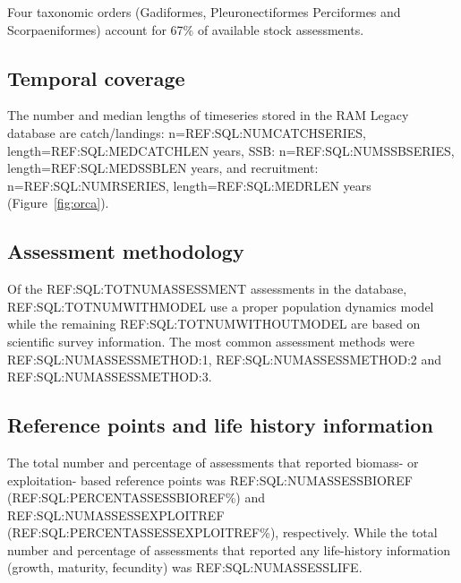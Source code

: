 Four taxonomic orders (Gadiformes, Pleuronectiformes Perciformes and Scorpaeniformes) account for 67\% of available stock assessments.


\subsection*{Temporal coverage}
The number and median lengths of timeseries stored in the RAM Legacy database are catch/landings: n=REF:SQL:NUMCATCHSERIES, length=REF:SQL:MEDCATCHLEN years, SSB: n=REF:SQL:NUMSSBSERIES, length=REF:SQL:MEDSSBLEN years, and recruitment: n=REF:SQL:NUMRSERIES, length=REF:SQL:MEDRLEN years (Figure~\ref{fig:orca}).
\subsection*{Assessment methodology}
Of the REF:SQL:TOTNUMASSESSMENT assessments in the database, REF:SQL:TOTNUMWITHMODEL use a proper population dynamics model while the remaining REF:SQL:TOTNUMWITHOUTMODEL are based on scientific survey information. The most common assessment methods were REF:SQL:NUMASSESSMETHOD:1, REF:SQL:NUMASSESSMETHOD:2 and REF:SQL:NUMASSESSMETHOD:3.

\subsection*{Reference points and life history information}
The total number and percentage of assessments that reported biomass- or exploitation- based reference points was REF:SQL:NUMASSESSBIOREF (REF:SQL:PERCENTASSESSBIOREF\%) and REF:SQL:NUMASSESSEXPLOITREF (REF:SQL:PERCENTASSESSEXPLOITREF\%), respectively. While the total number and percentage of assessments that reported any life-history information (growth, maturity, fecundity) was REF:SQL:NUMASSESSLIFE.










